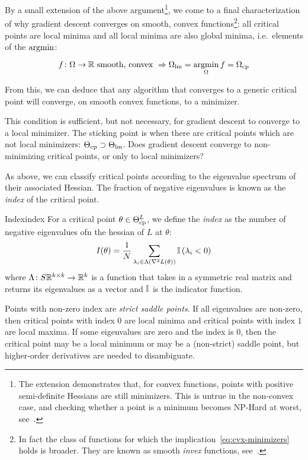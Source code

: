 \documentclass[../../thesis.tex]{subfiles}
\begin{document}
By a small extension of the above
argument\footnote{The extension demonstrates that,
for convex functions,
points with positive semi-definite Hessians
are still minimizers.
This is untrue in the non-convex case,
and checking whether a point is a minimum becomes NP-Hard at worst,
see~\cite{murty1987}.},
we come to a final characterization
of why gradient descent converges on smooth, convex
functions\footnote{In fact
the class of functions for which the implication~\ref{eq:cvx-minimizers}
holds is broader.
They are known as smooth \emph{invex} functions,
see~\cite{invex2008}.}:
all critical points are local minima
and all local minima are also global minima,
i.e.~elements of the $\mathop{\mathrm{argmin}}$:

\begin{equation}\equationlabel{cvx-minimizers}
	f\from\Omega\to\R \text{\ smooth, convex\ }
	\Rightarrow \Omega_{\lm} = \argmin_{\Omega} f = \Omega_{\cp}
\end{equation}

From this, we can deduce
that any algorithm that converges to a generic critical point will converge,
on smooth convex functions, to a minimizer.

This condition is sufficient, but not necessary,
for gradient descent to converge to a local minimizer.
The sticking point is when there are
critical points which are not local minimizers:
$\Theta_{\mathrm{cp}} \supset \Theta_{\mathrm{lm}}$.
Does gradient descent converge to non-minimizing critical points,
or only to local minimizers?

As above, we can classify critical points according to the
eigenvalue spectrum of their associated Hessian.
The fraction of negative eigenvalues is known as the
\emph{index} of the critical point.

\begin{definition}{Index}{index}
	For a critical point $\theta\in\Theta^L_{\mathrm{cp}}$,
	we define the \emph{index}
	as the number of negative eigenvalues
	ofn the hessian of $L$ at $\theta$:
	\begin{equation}\equationlabel{def-index}
		I(\theta) = \frac{1}{N}
		\sum_{\lambda_i \in \Lambda\left(\hess{L}{\theta}\right)}%
		{\Ind\left(\lambda_i < 0\right)}
	\end{equation}
	where $\Lambda\colon S\mathbb{R}^{k\times k}\to\mathbb{R}^k$
	is a function that takes in a symmetric real matrix
	and returns its eigenvalues as a vector
	and $\mathbb{I}$ is the indicator function.
\end{definition}

Points with non-zero index are \emph{strict saddle points}.
If all eigenvalues are non-zero,
then critical points with index $0$ are local minima
and critical points with index $1$ are local maxima.
If some eigenvalues are zero and the index is $0$,
then the critical point may be a local minimum
or may be a (non-strict) saddle point,
but higher-order derivatives are needed to disambiguate.
\end{document}
